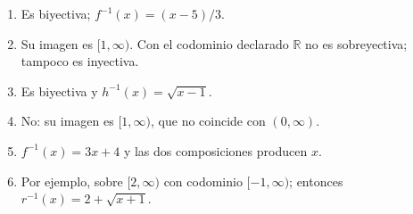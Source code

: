 \ifmostrarSoluciones
\begin{solucion}
\begin{enumerate}
  \item Es biyectiva; $f^{-1}(x)=(x-5)/3$.
  \item Su imagen es $[1,\infty)$. Con el codominio declarado $\mathbb{R}$ no es sobreyectiva; tampoco es inyectiva.
  \item Es biyectiva y $h^{-1}(x)=\sqrt{x-1}$.
  \item No: su imagen es $[1,\infty)$, que no coincide con $(0,\infty)$.
  \item $f^{-1}(x)=3x+4$ y las dos composiciones producen $x$.
  \item Por ejemplo, sobre $[2,\infty)$ con codominio $[-1,\infty)$; entonces $r^{-1}(x)=2+\sqrt{x+1}$.
\end{enumerate}
\end{solucion}
\fi

\ifdefined\documentoSemanal
\else
{}

\fi
